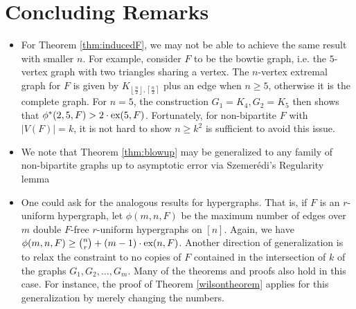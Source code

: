 \documentclass[12pt]{article}
\newcommand*{\ex}{\textnormal{ex}}
\begin{document}
\section{Concluding Remarks}

\begin{itemize}
  \item For Theorem \ref{thm:inducedF}, we may not be able to achieve the same result with smaller $n$. For example, consider $F$ to be the bowtie graph, i.e. the $5$-vertex graph with two triangles sharing a vertex. The $n$-vertex extremal graph for $F$ is given by $K_{\left\lfloor\frac{n}{2}\right\rfloor, \left\lceil\frac{n}{2}\right\rceil}$ plus an edge when $n \geq 5$, otherwise it is the complete graph. For $n = 5$, the construction $G_1 = K_{4}, G_2 = K_5$ then shows that $\phi^*(2, 5, F) > 2 \cdot \ex(5, F)$. Fortunately, for non-bipartite $F$ with $|V(F)| = k$, it is not hard to show $n \geq k^2$ is sufficient to avoid this issue.
  
  \item We note that Theorem \ref{thm:blowup} may be generalized to any family of non-bipartite graphs up to asymptotic error via Szemer\'{e}di's Regularity lemma
  
  \item One could ask for the analogous results for hypergraphs. That is, if $F$ is an $r$-uniform hypergraph, let $\phi(m, n, F)$ be the maximum number of edges over $m$ double $F$-free $r$-uniform hypergraphs on $[n]$. Again, we have $\phi(m, n, F) \geq \binom{n}{r} + (m - 1) \cdot \ex(n, F)$. Another direction of generalization is to relax the constraint to no copies of $F$ contained in the intersection of $k$ of the graphs $G_1, G_2, \ldots, G_m$. Many of the theorems and proofs also hold in this case. For instance, the proof of Theorem \ref{wilsontheorem} applies for this generalization by merely changing the numbers.
\end{itemize}



\end{document}
